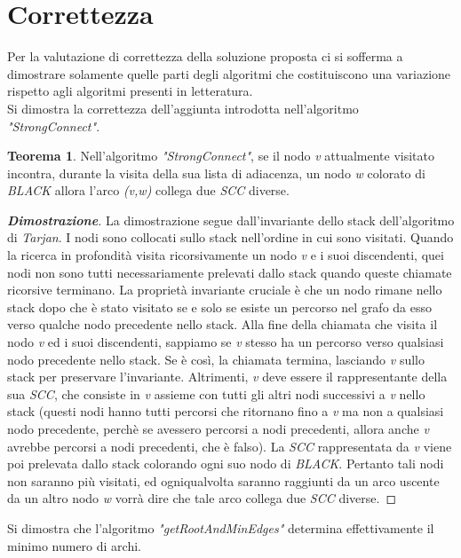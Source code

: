 \documentclass[10pt,a4paper,oneside,article,italian]{memoir}
\theoremstyle{definition}
\newtheorem{teorema}{Teorema}
\begin{document}
\section{Correttezza}
Per la valutazione di correttezza della soluzione proposta ci si sofferma a dimostrare solamente quelle parti degli algoritmi che costituiscono una variazione rispetto agli algoritmi presenti in letteratura.\\
Si dimostra la correttezza dell'aggiunta introdotta nell'algoritmo \textit{"StrongConnect"}.
\begin{teorema}
Nell'algoritmo \textit{"StrongConnect"}, se il nodo \textit{v} attualmente visitato incontra, durante la visita della sua lista di adiacenza, un nodo \textit{w} colorato di \textit{BLACK} allora l'arco \textit{(v,w)} collega due \textit{SCC} diverse.
\end{teorema}
\begin{proof}[\textbf{Dimostrazione}]
La dimostrazione segue dall'invariante dello stack dell'algoritmo di \textit{Tarjan}. I nodi sono collocati sullo stack nell'ordine in cui sono visitati. Quando la ricerca in profondità visita ricorsivamente un nodo \textit{v} e i suoi discendenti, quei nodi non sono tutti necessariamente prelevati dallo stack quando queste chiamate ricorsive terminano. La proprietà invariante cruciale è che un nodo rimane nello stack dopo che è stato visitato se e solo se esiste un percorso nel grafo da esso verso qualche nodo precedente nello stack. Alla fine della chiamata che visita il nodo \textit{v} ed i suoi discendenti, sappiamo se \textit{v} stesso ha un percorso verso qualsiasi nodo precedente nello stack. Se è così, la chiamata termina, lasciando \textit{v} sullo stack per preservare l'invariante. Altrimenti, \textit{v} deve essere il rappresentante della sua \textit{SCC}, che consiste in \textit{v} assieme con tutti gli altri nodi successivi a \textit{v} nello stack (questi nodi hanno tutti percorsi che ritornano fino a \textit{v} ma non a qualsiasi nodo precedente, perchè se avessero percorsi a nodi precedenti, allora anche \textit{v} avrebbe percorsi a nodi precedenti, che è falso). La \textit{SCC} rappresentata da \textit{v} viene poi prelevata dallo stack colorando ogni suo nodo di \textit{BLACK}. Pertanto tali nodi non saranno più visitati, ed ogniqualvolta saranno raggiunti da un arco uscente da un altro nodo \textit{w} vorrà dire che tale arco collega due \textit{SCC} diverse.
\end{proof}
Si dimostra che l'algoritmo \textit{"getRootAndMinEdges"} determina effettivamente il minimo numero di archi.
\end{document}
